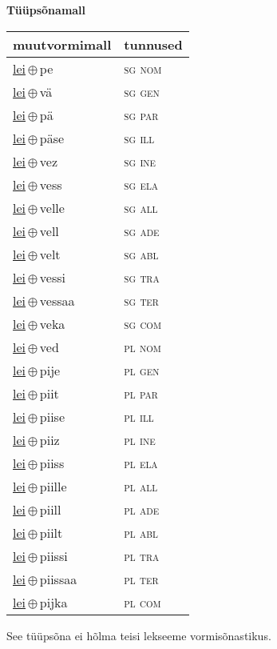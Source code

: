 

\vspace{3.5em}
\noindent \begin{minipage}{\textwidth}
\noindent \textbf{Tüüpsõnamall \,}\\

\begin{sideways}
\begin{tabular}{l l}
muutvormimall & tunnused \\
\hline
\underline{lei}\,$\oplus$\,pe & \textsc{ sg nom } \\
\underline{lei}\,$\oplus$\,vä & \textsc{ sg gen } \\
\underline{lei}\,$\oplus$\,pä & \textsc{ sg par } \\
\underline{lei}\,$\oplus$\,päse & \textsc{ sg ill } \\
\underline{lei}\,$\oplus$\,vez & \textsc{ sg ine } \\
\underline{lei}\,$\oplus$\,vess & \textsc{ sg ela } \\
\underline{lei}\,$\oplus$\,velle & \textsc{ sg all } \\
\underline{lei}\,$\oplus$\,vell & \textsc{ sg ade } \\
\underline{lei}\,$\oplus$\,velt & \textsc{ sg abl } \\
\underline{lei}\,$\oplus$\,vessi & \textsc{ sg tra } \\
\underline{lei}\,$\oplus$\,vessaa & \textsc{ sg ter } \\
\underline{lei}\,$\oplus$\,veka & \textsc{ sg com } \\
\underline{lei}\,$\oplus$\,ved & \textsc{ pl nom } \\
\underline{lei}\,$\oplus$\,pije & \textsc{ pl gen } \\
\underline{lei}\,$\oplus$\,piit & \textsc{ pl par } \\
\underline{lei}\,$\oplus$\,piise & \textsc{ pl ill } \\
\underline{lei}\,$\oplus$\,piiz & \textsc{ pl ine } \\
\underline{lei}\,$\oplus$\,piiss & \textsc{ pl ela } \\
\underline{lei}\,$\oplus$\,piille & \textsc{ pl all } \\
\underline{lei}\,$\oplus$\,piill & \textsc{ pl ade } \\
\underline{lei}\,$\oplus$\,piilt & \textsc{ pl abl } \\
\underline{lei}\,$\oplus$\,piissi & \textsc{ pl tra } \\
\underline{lei}\,$\oplus$\,piissaa & \textsc{ pl ter } \\
\underline{lei}\,$\oplus$\,pijka & \textsc{ pl com } \\
\end{tabular}
\end{sideways}
\label{tab:tüüpsõnamall-leipe}

\end{minipage}

 
\vspace{1em}
\noindent See tüüpsõna ei hõlma teisi lekseeme vormi\-sõnastikus.

